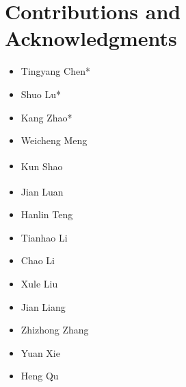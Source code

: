 \section*{Contributions and Acknowledgments}
\label{sec:contributions}

\vspace{4pt}
\noindent
\begin{minipage}[t]{0.45\textwidth}
\textbf{\textsf{}}
\begin{itemize}[leftmargin=12pt, itemsep=1pt, parsep=0pt, topsep=4pt]
  \item Tingyang Chen*
  \item Shuo Lu*
  \item Kang Zhao*
  \item Weicheng Meng
  \item Kun Shao\textsuperscript{\dag}
  \item Jian Luan\textsuperscript{\dag}
\end{itemize}
\end{minipage}%
\hfill
\begin{minipage}[t]{0.45\textwidth}
\textbf{\textsf{}}
\begin{itemize}[leftmargin=12pt, itemsep=1pt, parsep=0pt, topsep=4pt]
  \item Hanlin Teng
  \item Tianhao Li
  \item Chao Li
  \item Xule Liu
  \item Jian Liang
  \item Zhizhong Zhang
  \item Yuan Xie
  \item Heng Qu
\end{itemize}
\end{minipage}

\let\thefootnote\relax{}
